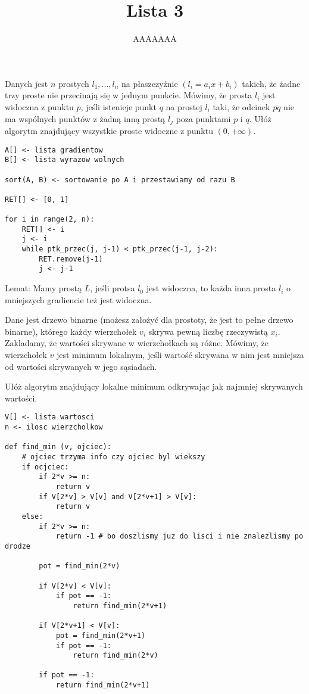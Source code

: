 \documentclass{article}
\title{Lista 3}
\author{AAAAAAA}
\date{}
\begin{document}
\begin{problem}[2]{}
    Danych jest $n$ prostych $l_1,..., l_n$ na płaszczyźnie $(l_i=a_ix+b_i)$ takich, że żadne trzy proste nie przecinają się w jednym punkcie. Mówimy, że prosta $l_i$ jest widoczna z punktu $p$, jeśli istenieje punkt $q$ na prostej $l_i$ taki, że odcinek $\overline{pq}$ nie ma wspólnych punktów z żadną inną prostą $l_j$ poza punktami $p$ i $q$. Ułóż algorytm znajdujący wszystkie proste widoczne z punktu $(0, +\infty)$.
\end{problem}

\begin{lstlisting}
A[] <- lista gradientow
B[] <- lista wyrazow wolnych

sort(A, B) <- sortowanie po A i przestawiamy od razu B

RET[] <- [0, 1]

for i in range(2, n):
    RET[] <- i
    j <- i
    while ptk_przec(j, j-1) < ptk_przec(j-1, j-2):
        RET.remove(j-1)
        j <- j-1

\end{lstlisting}

Lemat: Mamy prostą $L$, jeśli protsa $l_0$ jest widoczna, to każda inna prosta $l_i$ o mniejszych gradiencie też jest widoczna.

\begin{problem}[4]{}
Dane jest drzewo binarne (możesz założyć dla prostoty, że jest to pełne drzewo binarne), którego każdy wierzchołek $v_i$ skrywa pewną liczbę rzeczywistą $x_i$. Zakladamy, że wartości skrywane w wierzchołkach są różne. Mówimy, że wierzchołek $v$ jest minimum lokalnym, jeśli wartość skrywana w nim jest mniejsza od wartości skrywanych w jego sąsiadach.

Ułóż algorytm znajdujący lokalne minimum odkrywając jak najmniej skrywanych wartości.
\end{problem}

\begin{lstlisting}
V[] <- lista wartosci
n <- ilosc wierzcholkow

def find_min (v, ojciec):
    # ojciec trzyma info czy ojciec byl wiekszy
    if ocjciec:
        if 2*v >= n:
            return v
        if V[2*v] > V[v] and V[2*v+1] > V[v]:
            return v
    else:
        if 2*v >= n:
            return -1 # bo doszlismy juz do lisci i nie znalezlismy po drodze

        pot = find_min(2*v)

        if V[2*v] < V[v]:
            if pot == -1:
                return find_min(2*v+1)

        if V[2*v+1] < V[v]:
            pot = find_min(2*v+1)
            if pot == -1:
                return find_min(2*v)

        if pot == -1:
            return find_min(2*v+1)

\end{lstlisting}
\end{document}
